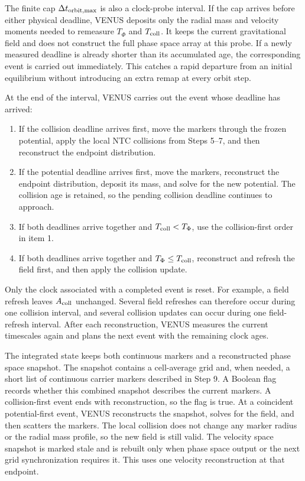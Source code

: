 The finite cap \(\Delta t_{\rm orbit,max}\) is also a clock-probe interval.
If the cap arrives before either physical deadline, VENUS deposits only the
radial mass and velocity moments needed to remeasure \(T_\Phi\) and
\(T_{\rm coll}\).  It keeps the current gravitational field and does not
construct the full phase space array at this probe.  If a newly measured
deadline is already shorter than its accumulated age, the corresponding
event is carried out immediately.  This catches a rapid departure from an
initial equilibrium without introducing an extra remap at every orbit step.

At the end of the interval, VENUS carries out the event whose deadline has
arrived:
\begin{enumerate}
\item If the collision deadline arrives first, move the markers through the
frozen potential, apply the local NTC collisions from Steps 5--7, and then
reconstruct the endpoint distribution.
\item If the potential deadline arrives first, move the markers, reconstruct
the endpoint distribution, deposit its mass, and solve for the new potential.
The collision age is retained, so the pending collision deadline continues
to approach.
\item If both deadlines arrive together and \(T_{\rm coll}<T_\Phi\), use the
collision-first order in item 1.
\item If both deadlines arrive together and \(T_\Phi\leq T_{\rm coll}\),
reconstruct and refresh the field first, and then apply the collision update.
\end{enumerate}

Only the clock associated with a completed event is reset.  For example, a
field refresh leaves \(A_{\rm coll}\) unchanged.  Several field refreshes can
therefore occur during one collision interval, and several collision updates
can occur during one field-refresh interval.  After each reconstruction,
VENUS measures the current timescales again and plans the next event with the
remaining clock ages.

The integrated state keeps both continuous markers and a reconstructed
phase space snapshot.  The snapshot contains a cell-average grid and, when
needed, a short list of continuous carrier markers described in Step 9.  A
Boolean flag records whether this combined snapshot describes the current
markers.  A collision-first event ends with reconstruction, so the flag is
true.  At a coincident potential-first event, VENUS reconstructs the snapshot,
solves for the field, and then scatters the markers.  The local collision does
not change any marker radius or the radial mass profile, so the new field is
still valid.  The velocity space snapshot is marked stale and is rebuilt only
when phase space output or the next grid synchronization requires it.  This
uses one velocity reconstruction at that endpoint.

